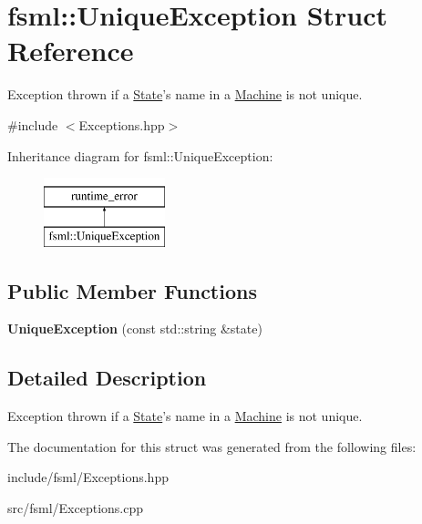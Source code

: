 \hypertarget{structfsml_1_1UniqueException}{\section{fsml\-:\-:Unique\-Exception Struct Reference}
\label{structfsml_1_1UniqueException}
}


Exception thrown if a \hyperlink{classfsml_1_1State}{State}'s name in a \hyperlink{classfsml_1_1Machine}{Machine} is not unique.  




{\ttfamily \#include $<$Exceptions.\-hpp$>$}

Inheritance diagram for fsml\-:\-:Unique\-Exception\-:\begin{figure}[H]
\begin{center}
\leavevmode
\includegraphics[height=2.000000cm]{structfsml_1_1UniqueException}
\end{center}
\end{figure}
\subsection*{Public Member Functions}
\begin{DoxyCompactItemize}
\item 
\hypertarget{structfsml_1_1UniqueException_a14fc471605daa57d638a35756fa66901}{{\bfseries Unique\-Exception} (const std\-::string \&state)}\label{structfsml_1_1UniqueException_a14fc471605daa57d638a35756fa66901}

\end{DoxyCompactItemize}


\subsection{Detailed Description}
Exception thrown if a \hyperlink{classfsml_1_1State}{State}'s name in a \hyperlink{classfsml_1_1Machine}{Machine} is not unique. 



The documentation for this struct was generated from the following files\-:\begin{DoxyCompactItemize}
\item 
include/fsml/Exceptions.\-hpp\item 
src/fsml/Exceptions.\-cpp\end{DoxyCompactItemize}
